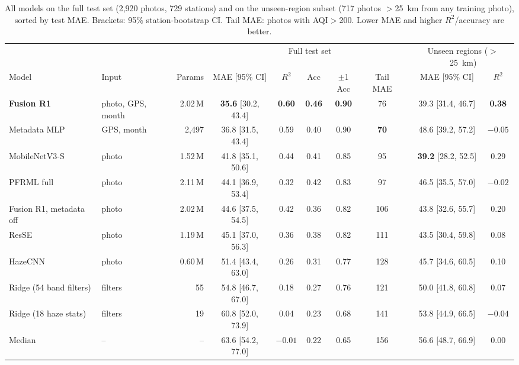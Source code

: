 \documentclass[conference]{IEEEtran}
\begin{document}
\begin{table}[!t]
  \centering
  \caption{All models on the full test set (2,920 photos, 729 stations) and on
  the unseen-region subset (717 photos $>$25~km from any training photo),
  sorted by test MAE. Brackets: 95\% station-bootstrap CI. Tail MAE: photos with
  AQI$>$200. Lower MAE and higher $R^2$/accuracy are better.}
  \label{tab:main}
  \setlength{\tabcolsep}{4pt}
  \begin{tabular}{llrcccccccc}
    \toprule
    & & & \multicolumn{6}{c}{Full test set} & \multicolumn{2}{c}{Unseen regions ($>$25~km)} \\
    \cmidrule(lr){4-9}\cmidrule(lr){10-11}
    Model & Input & Params & MAE [95\% CI] & $R^2$ & Acc & $\pm$1 Acc & Tail MAE & & MAE [95\% CI] & $R^2$ \\
    \midrule
    \textbf{Fusion R1} & photo, GPS, month & 2.02\,M & \textbf{35.6} [30.2, 43.4] & \textbf{0.60} & \textbf{0.46} & \textbf{0.90} & 76 & & 39.3 [31.4, 46.7] & \textbf{0.38} \\
    Metadata MLP & GPS, month & 2,497 & 36.8 [31.5, 43.4] & 0.59 & 0.40 & 0.90 & \textbf{70} & & 48.6 [39.2, 57.2] & $-0.05$ \\
    MobileNetV3-S & photo & 1.52\,M & 41.8 [35.1, 50.6] & 0.44 & 0.41 & 0.85 & 95 & & \textbf{39.2} [28.2, 52.5] & 0.29 \\
    PFRML full & photo & 2.11\,M & 44.1 [36.9, 53.4] & 0.32 & 0.42 & 0.83 & 97 & & 46.5 [35.5, 57.0] & $-0.02$ \\
    Fusion R1, metadata off & photo & 2.02\,M & 44.6 [37.5, 54.5] & 0.42 & 0.36 & 0.82 & 106 & & 43.8 [32.6, 55.7] & 0.20 \\
    ResSE & photo & 1.19\,M & 45.1 [37.0, 56.3] & 0.36 & 0.38 & 0.82 & 111 & & 43.5 [30.4, 59.8] & 0.08 \\
    HazeCNN & photo & 0.60\,M & 51.4 [43.4, 63.0] & 0.26 & 0.31 & 0.77 & 128 & & 45.7 [34.6, 60.5] & 0.10 \\
    Ridge (54 band filters) & filters & 55 & 54.8 [46.7, 67.0] & 0.18 & 0.27 & 0.76 & 121 & & 50.0 [41.8, 60.8] & 0.07 \\
    Ridge (18 haze stats) & filters & 19 & 60.8 [52.0, 73.9] & 0.04 & 0.23 & 0.68 & 141 & & 53.8 [44.9, 66.5] & $-0.04$ \\
    Median & -- & -- & 63.6 [54.2, 77.0] & $-0.01$ & 0.22 & 0.65 & 156 & & 56.6 [48.7, 66.9] & $0.00$ \\
    \bottomrule
  \end{tabular}
\end{table}
\end{document}
